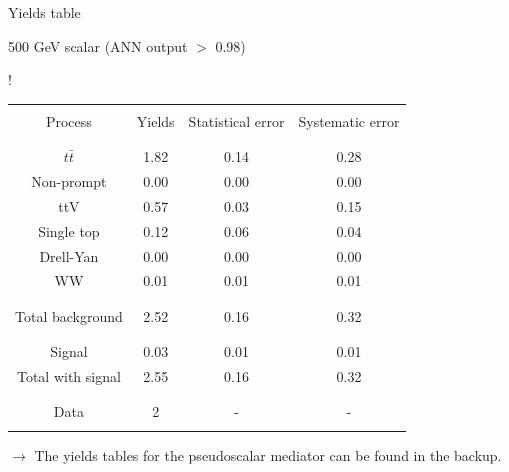 \documentclass[8 pt]{beamer}
\begin{document}
\begin{frame}{Yields table}
\begin{minipage}[c]{.48\linewidth}
	\end{minipage} \hfill
	\begin{minipage}[c]{.48\linewidth}
	
	\begin{exampleblock}{}{ \begin{center} 500 GeV scalar (ANN output $>$ 0.98) \end{center}} \end{exampleblock} \vspace{6pt}
	
	\resizebox{170pt} {!}{
	\begin{tabular}{c|c|c|c}
	 	& & & \\
		Process & Yields & Statistical error & Systematic error \\
		& & & \\
		\hline \hline
		& & & \\
		$t \bar t$ & 1.82 & 0.14 & 0.28 \\
		Non-prompt & 0.00 & 0.00 & 0.00 \\
		ttV & 0.57 & 0.03 & 0.15 \\
		Single top & 0.12 & 0.06 & 0.04 \\
		Drell-Yan & 0.00 & 0.00 & 0.00 \\
		WW & 0.01 & 0.01 & 0.01 \\
		& & & \\
		\hline
		& & & \\
		Total background & 2.52 & 0.16  & 0.32 \\
		& & & \\
		\hline
		& & & \\
		Signal & 0.03 & 0.01 & 0.01 \\
		Total with signal & 2.55 & 0.16 & 0.32 \\
		& & & \\
		\hline
		& & & \\
		Data & 2 & - & - \\
		& & & \\
	\end{tabular}
	} 
	
	\end{minipage} \hfill \vfill
	
	\justifying
	$\rightarrow$ The yields tables for the pseudoscalar mediator can be found in the backup. \vfill

\end{frame}
\end{document}
